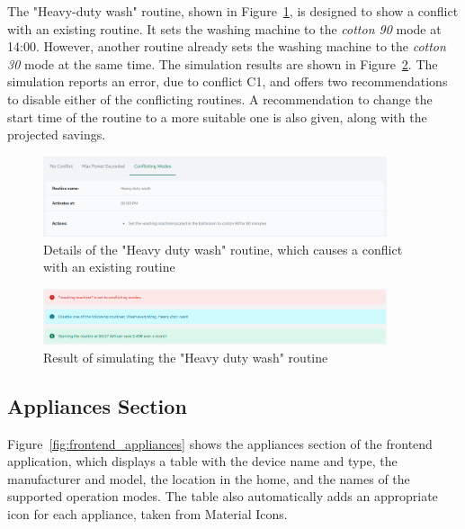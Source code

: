The "Heavy-duty wash" routine, shown in Figure~\ref{fig:frontend_conflicting_modes}, is designed to show a conflict with an existing routine. It sets the washing machine to the \textit{cotton 90} mode at 14:00. However, another routine already sets the washing machine to the \textit{cotton 30} mode at the same time. The simulation results are shown in Figure~\ref{fig:frontend_conflicting_modes_result}. The simulation reports an error, due to conflict C1, and offers two recommendations to disable either of the conflicting routines. A recommendation to change the start time of the routine to a more suitable one is also given, along with the projected savings.

\begin{figure}
    \centering
    \includegraphics[width=0.9\textwidth]{images/frontend/conflicting_modes.png}
    \caption{Details of the "Heavy duty wash" routine, which causes a conflict with an existing routine}
    \label{fig:frontend_conflicting_modes}
\end{figure}

\begin{figure}
    \centering
    \includegraphics[width=0.9\textwidth]{images/frontend/conflicting_modes_result.png}
    \caption{Result of simulating the "Heavy duty wash" routine}
    \label{fig:frontend_conflicting_modes_result}
\end{figure}

\subsection{Appliances Section}

Figure~\ref{fig:frontend_appliances} shows the appliances section of the frontend application, which displays a table with the device name and type, the manufacturer and model, the location in the home, and the names of the supported operation modes. The table also automatically adds an appropriate icon for each appliance, taken from Material Icons.

